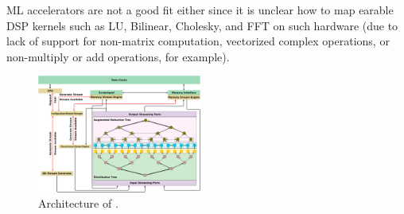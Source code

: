 ML accelerators are not a good fit either
since it is unclear how to map earable DSP kernels such as LU, Bilinear, Cholesky, and FFT on such hardware (due to lack of
support for non-matrix computation, vectorized complex operations, or non-multiply or add
operations, for example). 

\begin{figure}[h]
  \centering
  \includegraphics[width=0.48\textwidth]{arch.png}
  \caption{
  \small
  Architecture of \arch{}.}
  \label{fig:earable_arch}
\end{figure}

